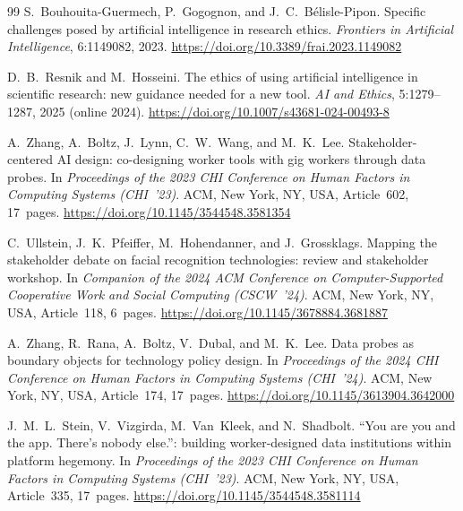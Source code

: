 \documentclass[sigconf,screen]{acmart}
\begin{document}
\begin{thebibliography}{99}
S.~Bouhouita-Guermech, P.~Gogognon, and J.~C.~B\'{e}lisle-Pipon.
\newblock Specific challenges posed by artificial intelligence in research ethics.
\newblock \emph{Frontiers in Artificial Intelligence}, 6:1149082, 2023.
\newblock \url{https://doi.org/10.3389/frai.2023.1149082}

D.~B.~Resnik and M.~Hosseini.
\newblock The ethics of using artificial intelligence in scientific research: new
guidance needed for a new tool.
\newblock \emph{AI and Ethics}, 5:1279--1287, 2025 (online 2024).
\newblock \url{https://doi.org/10.1007/s43681-024-00493-8}

A.~Zhang, A.~Boltz, J.~Lynn, C.~W.~Wang, and M.~K.~Lee.
\newblock Stakeholder-centered AI design: co-designing worker tools with gig workers
through data probes.
\newblock In \emph{Proceedings of the 2023 CHI Conference on Human Factors in
Computing Systems (CHI~'23)}. ACM, New York, NY, USA, Article~602, 17~pages.
\newblock \url{https://doi.org/10.1145/3544548.3581354}

C.~Ullstein, J.~K.~Pfeiffer, M.~Hohendanner, and J.~Grossklags.
\newblock Mapping the stakeholder debate on facial recognition technologies: review
and stakeholder workshop.
\newblock In \emph{Companion of the 2024 ACM Conference on Computer-Supported
Cooperative Work and Social Computing (CSCW~'24)}. ACM, New York, NY, USA,
Article~118, 6~pages.
\newblock \url{https://doi.org/10.1145/3678884.3681887}

A.~Zhang, R.~Rana, A.~Boltz, V.~Dubal, and M.~K.~Lee.
\newblock Data probes as boundary objects for technology policy design.
\newblock In \emph{Proceedings of the 2024 CHI Conference on Human Factors in
Computing Systems (CHI~'24)}. ACM, New York, NY, USA, Article~174, 17~pages.
\newblock \url{https://doi.org/10.1145/3613904.3642000}

J.~M.~L.~Stein, V.~Vizgirda, M.~Van~Kleek, and N.~Shadbolt.
\newblock ``You are you and the app. There's nobody else.'': building worker-designed
data institutions within platform hegemony.
\newblock In \emph{Proceedings of the 2023 CHI Conference on Human Factors in
Computing Systems (CHI~'23)}. ACM, New York, NY, USA, Article~335, 17~pages.
\newblock \url{https://doi.org/10.1145/3544548.3581114}


\end{thebibliography}
\end{document}
